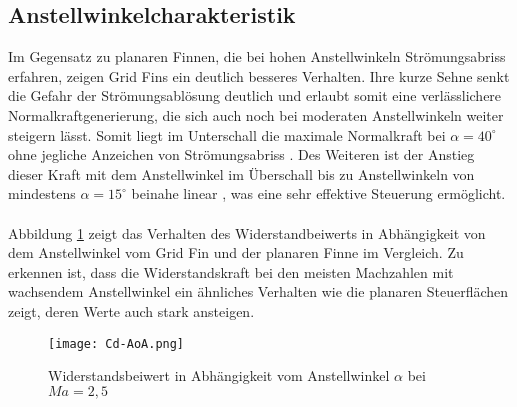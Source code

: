 \subsection{Anstellwinkelcharakteristik}
Im Gegensatz zu planaren Finnen, die bei hohen Anstellwinkeln Strömungsabriss erfahren, zeigen Grid Fins ein deutlich besseres Verhalten. Ihre kurze Sehne senkt die Gefahr der Strömungsablösung deutlich und erlaubt somit eine verlässlichere Normalkraftgenerierung, die sich auch noch bei moderaten Anstellwinkeln weiter steigern lässt. Somit liegt im Unterschall die maximale Normalkraft bei $\alpha = 40^\circ$ ohne jegliche Anzeichen von Strömungsabriss \cite{synopsis}.
Des Weiteren ist der Anstieg dieser Kraft mit dem Anstellwinkel im Überschall bis zu Anstellwinkeln von mindestens $\alpha=15^\circ$ beinahe linear \cite{synopsis}, was eine sehr effektive Steuerung ermöglicht.\\
~\\
Abbildung \ref{abb_Cd-AoA} zeigt das Verhalten des Widerstandbeiwerts in Abhängigkeit von dem Anstellwinkel vom Grid Fin und der planaren Finne im Vergleich.
Zu erkennen ist, dass die Widerstandskraft bei den meisten Machzahlen mit wachsendem Anstellwinkel ein ähnliches Verhalten wie die planaren Steuerflächen \cite{vergleichPlanarNATO} zeigt, deren Werte auch stark ansteigen.
\begin{figure}[h]
	\centering
	\texttt{[image: Cd-AoA.png]}
	\begin{flushright}
	\end{flushright}
	\caption{Widerstandsbeiwert in Abhängigkeit vom Anstellwinkel $\alpha$ bei $Ma=2,5$}
	\label{abb_Cd-AoA}
\end{figure}\\

